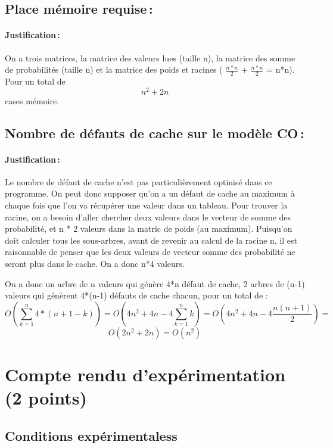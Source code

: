 \documentclass[a4paper, 10pt, french]{article}
\begin{document}
  \subsection{Place mémoire requise\,: }
    \paragraph{Justification\,: }
On a trois matrices, la matrice des valeurs lues (taille n), la matrice des somme de probabilités (taille n) et la matrice des poids et racines ( $\frac{n*n}{2}$ + $\frac{n*n}{2}$ = n*n). Pour un total de $$ n^2 + 2n$$ cases mémoire.

  \subsection{Nombre de défauts de cache sur le modèle CO\,: }
    \paragraph{Justification\,: }
Le nombre de défaut de cache n'est pas particulièrement optinisé dans ce programme. 
On peut donc supposer qu'on a un défaut de cache au maximum à chaque fois que l'on va récupérer une valeur dans un tableau. Pour trouver la racine, on a besoin d'aller chercher deux valeurs dans le vecteur de somme des probabilité, et n * 2 valeurs dans la matric de poids (au maximum). Puisqu'on doit calculer tous les sous-arbres, avant de revenir au calcul de la racine n, il est raisonnable de penser que les deux valeurs de vecteur somme des probabilité ne seront plus dans le cache. On a donc n*4 valeurs.

On a donc un arbre de n valeurs qui génère 4*n défaut de cache, 2 arbres de (n-1) valeurs qui génèrent 4*(n-1) défauts de cache chacun, pour un total de :
$$ O(\sum_{k = 1}^{n} 4*(n+1-k)) = 
O(4n^2 + 4n - 4\sum_{k = 1}^{n} k)= 
O(4n^2 + 4n - 4\frac{n(n+1)}{2}) = $$ $$ 
O(2n^2 + 2n) = O(n^2)$$ 

\section{Compte rendu d'expérimentation (2 points)}
  \subsection{Conditions expérimentaless}
\end{document}
